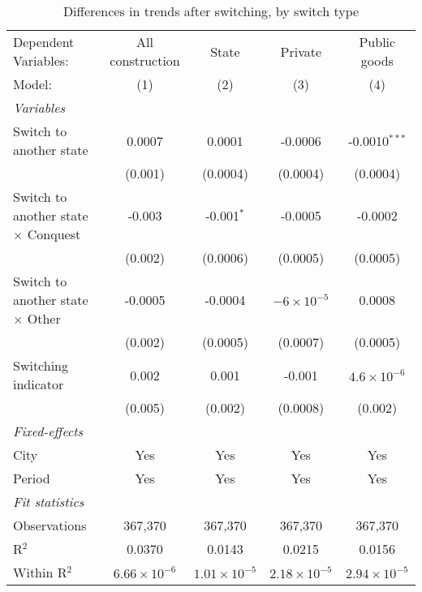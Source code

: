 \begin{table}[htbp]
   \caption{\label{tab:baseline_1y} Differences in trends after switching, by switch type}
   \centering
   \begin{tabular}{lcccc}
      \tabularnewline \midrule \midrule
      Dependent Variables:                       & All construction      & State                 & Private               & Public goods\\  
      Model:                                     & (1)                   & (2)                   & (3)                   & (4)\\  
      \midrule
      \emph{Variables}\\
      Switch to another state                    & 0.0007                & 0.0001                & -0.0006               & -0.0010$^{***}$\\   
                                                 & (0.001)               & (0.0004)              & (0.0004)              & (0.0004)\\   
      Switch to another state $\times$ Conquest  & -0.003                & -0.001$^{*}$          & -0.0005               & -0.0002\\   
                                                 & (0.002)               & (0.0006)              & (0.0005)              & (0.0005)\\   
      Switch to another state $\times$ Other     & -0.0005               & -0.0004               & $-6\times 10^{-5}$    & 0.0008\\   
                                                 & (0.002)               & (0.0005)              & (0.0007)              & (0.0005)\\   
      Switching indicator                        & 0.002                 & 0.001                 & -0.001                & $4.6\times 10^{-6}$\\    
                                                 & (0.005)               & (0.002)               & (0.0008)              & (0.002)\\   
      \midrule
      \emph{Fixed-effects}\\
      City                                       & Yes                   & Yes                   & Yes                   & Yes\\  
      Period                                     & Yes                   & Yes                   & Yes                   & Yes\\  
      \midrule
      \emph{Fit statistics}\\
      Observations                               & 367,370               & 367,370               & 367,370               & 367,370\\  
      R$^2$                                      & 0.0370                & 0.0143                & 0.0215                & 0.0156\\  
      Within R$^2$                               & $6.66\times 10^{-6}$  & $1.01\times 10^{-5}$  & $2.18\times 10^{-5}$  & $2.94\times 10^{-5}$\\   
      \midrule \midrule
      

\end{tabular}
\end{table}
